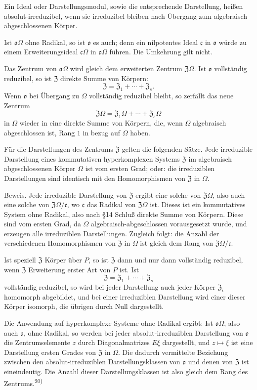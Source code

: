 \documentclass[11pt]{article}
\providecommand{\mo}{\mathfrak{o}}
\providecommand{\mc}{\mathfrak{c}}
\providecommand{\mZ}{\mathfrak{Z}}
\begin{document}
Ein Ideal oder Darstellungsmodul, sowie die entsprechende Darstellung, heißen absolut-irreduzibel, wenn sie irreduzibel bleiben nach Übergang zum algebraisch abgeschlossenen Körper.

Ist $\mo\Omega$ ohne Radikal, so ist $\mo$ es auch; denn ein nilpotentes Ideal $\mc$ in $\mo$ würde zu einem Erweiterungsideal $\mc\Omega$ in $\mo\Omega$ führen. Die Umkehrung gilt nicht.

Das Zentrum von $\mo\Omega$ wird gleich dem erweiterten Zentrum $\mZ\Omega$. Ist $\mo$ vollständig reduzibel, so ist $\mZ$ direkte Summe von Körpern:
\[
        \mZ=\mZ_1+\cdots+\mZ_s.
\]
Wenn $\mo$ bei Übergang zu $\Omega$ vollständig reduzibel bleibt, so zerfällt das neue Zentrum
\[
        \mZ\Omega=\mZ_1\Omega+\cdots+\mZ_s\Omega
\]
in $\Omega$ wieder in eine direkte Summe von Körpern, die, wenn $\Omega$ algebraisch abgeschlossen ist, Rang $1$ in bezug auf $\Omega$ haben.

Für die Darstellungen des Zentrums $\mZ$ gelten die folgenden Sätze. Jede irreduzible Darstellung eines kommutativen hyperkomplexen Systems $\mZ$ im algebraisch abgeschlossenen Körper $\Omega$ ist vom ersten Grad; oder: die irreduziblen Darstellungen sind identisch mit den Homomorphismen von $\mZ$ in $\Omega$.

Beweis. Jede irreduzible Darstellung von $\mZ$ ergibt eine solche von $\mZ\Omega$, also auch eine solche von $\mZ\Omega/\mc$, wo $\mc$ das Radikal von $\mZ\Omega$ ist. Dieses ist ein kommutatives System ohne Radikal, also nach §14 Schluß direkte Summe von Körpern. Diese sind vom ersten Grad, da $\Omega$ algebraisch-abgeschlossen vorausgesetzt wurde, und erzeugen alle irreduziblen Darstellungen. Zugleich folgt: die Anzahl der verschiedenen Homomorphismen von $\mZ$ in $\Omega$ ist gleich dem Rang von $\mZ\Omega/\mc$.

Ist speziell $\mZ$ Körper über $P$, so ist $\mZ$ dann und nur dann vollständig reduzibel, wenn $\mZ$ Erweiterung erster Art von $P$ ist. Ist
\[
        \mZ=\mZ_1+\cdots+\mZ_s
\]
vollständig reduzibel, so wird bei jeder Darstellung auch jeder Körper $\mZ_i$ homomorph abgebildet, und bei einer irreduziblen Darstellung wird einer dieser Körper isomorph, die übrigen durch Null dargestellt.

Die Anwendung auf hyperkomplexe Systeme ohne Radikal ergibt: Ist $\mo\Omega$, also auch $\mo$, ohne Radikal, so werden bei jeder absolut-irreduziblen Darstellung von $\mo$ die Zentrumselemente $z$ durch Diagonalmatrizes $E\xi$ dargestellt, und $z\mapsto\xi$ ist eine Darstellung ersten Grades von $\mZ$ in $\Omega$. Die dadurch vermittelte Beziehung zwischen den absolut-irreduziblen Darstellungsklassen von $\mo$ und denen von $\mZ$ ist eineindeutig. Die Anzahl dieser Darstellungsklassen ist also gleich dem Rang des Zentrums.\textsuperscript{20)}
\end{document}
